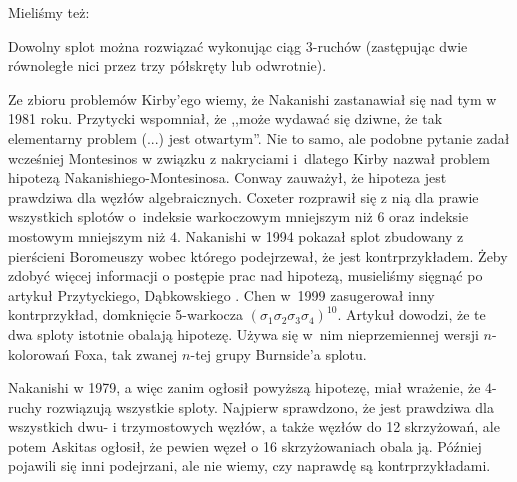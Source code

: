 Mieliśmy też:

\begin{conjecture}
    Dowolny splot można rozwiązać wykonując ciąg 3-ruchów (zastępując dwie równoległe nici przez trzy półskręty lub odwrotnie).
\end{conjecture}

Ze zbioru problemów Kirby'ego \cite{kirby1978} wiemy, że Nakanishi zastanawiał się nad tym w 1981 roku.
%
Przytycki \cite[s. 199]{przytycki1995} wspomniał, że ,,może wydawać się dziwne, że tak elementarny problem (...) jest otwartym''.
Nie to samo, ale podobne pytanie zadał wcześniej Montesinos w związku z nakryciami i~dlatego Kirby nazwał problem hipotezą Nakanishiego-Montesinosa.
%
Conway zauważył, że hipoteza jest prawdziwa dla węzłów algebraicznych.
%
Coxeter rozprawił się z nią dla prawie wszystkich splotów o~indeksie warkoczowym mniejszym niż $6$ oraz indeksie mostowym mniejszym niż $4$.
%
Nakanishi w 1994 pokazał splot zbudowany z pierścieni Boromeuszy wobec którego podejrzewał, że jest kontrprzykładem.
%
Żeby zdobyć więcej informacji o postępie prac nad hipotezą, musieliśmy sięgnąć po artykuł Przytyckiego, Dąbkowskiego \cite{dabkowski2002}.
%
%
Chen w~1999 zasugerował inny kontrprzykład, domknięcie 5-warkocza $(\sigma_1\sigma_2\sigma_3\sigma_4)^{10}$.
%
Artykuł \cite{dabkowski2002} dowodzi, że te dwa sploty istotnie obalają hipotezę.
Używa się w~nim nieprzemiennej wersji $n$-kolorowań Foxa, tak zwanej $n$-tej grupy Burnside'a splotu.
%
%

Nakanishi w 1979, a więc zanim ogłosił powyższą hipotezę, miał wrażenie, że $4$-ruchy rozwiązują wszystkie sploty.
Najpierw sprawdzono, że jest prawdziwa dla wszystkich dwu- i trzymostowych węzłów, a także węzłów do 12 skrzyżowań, ale potem Askitas ogłosił, że pewien węzeł o 16 skrzyżowaniach obala ją.
%
Później pojawili się inni podejrzani, ale nie wiemy, czy naprawdę są kontrprzykładami.


